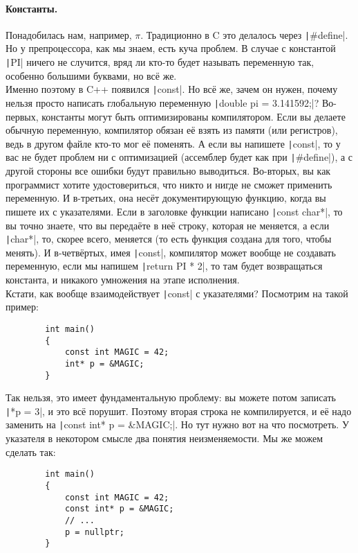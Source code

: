\documentclass{article}
\begin{document}
    \paragraph{Константы.}
    Понадобилась нам, например, $\pi$. Традиционно в C это делалось через \texttt|#define|. Но у препроцессора, как мы знаем, есть куча проблем. В случае с константой \texttt|PI| ничего не случится, вряд ли кто-то будет называть переменную так, особенно большими буквами, но всё же.\\
    Именно поэтому в C++ появился \texttt|const|. Но всё же, зачем он нужен, почему нельзя просто написать глобальную переменную \texttt|double pi = 3.141592;|? Во-первых, константы могут быть оптимизированы компилятором. Если вы делаете обычную переменную, компилятор обязан её взять из памяти (или регистров), ведь в другом файле кто-то мог её поменять. А если вы напишете \texttt|const|, то у вас не будет проблем ни с оптимизацией (ассемблер будет как при \texttt|#define|), а с другой стороны все ошибки будут правильно выводиться. Во-вторых, вы как программист хотите удостовериться, что никто и нигде не сможет применить переменную. И в-третьих, она несёт документирующую функцию, когда вы пишете их с указателями. Если в заголовке функции написано \texttt|const char*|, то вы точно знаете, что вы передаёте в неё строку, которая не меняется, а если \texttt|char*|, то, скорее всего, меняется (то есть функция создана для того, чтобы менять). И в-четвёртых, имея \texttt|const|, компилятор может вообще не создавать переменную, если мы напишем \texttt|return PI * 2|, то там будет возвращаться константа, и никакого умножения на этапе исполнения.\\
    Кстати, как вообще взаимодействует \texttt|const| с указателями? Посмотрим на такой пример:
    \begin{verbatim}
        int main()
        {
            const int MAGIC = 42;
            int* p = &MAGIC;
        }
    \end{verbatim}
    Так нельзя, это имеет фундаментальную проблему: вы можете потом записать \texttt|*p = 3|, и это всё порушит. Поэтому вторая строка не компилируется, и её надо заменить на \texttt|const int* p = &MAGIC;|. Но тут нужно вот на что посмотреть. У указателя в некотором смысле два понятия неизменяемости. Мы же можем сделать так:
    \begin{verbatim}
        int main()
        {
            const int MAGIC = 42;
            const int* p = &MAGIC;
            // ...
            p = nullptr;
        }
    \end{verbatim}
\end{document}
